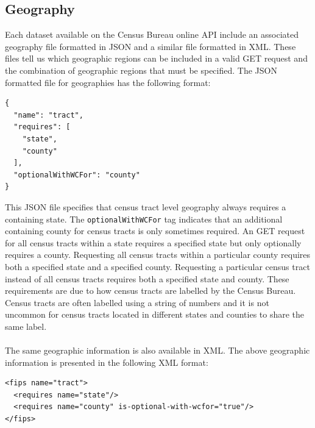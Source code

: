 \documentclass{article}\usepackage[]{graphicx}\usepackage[]{color}
\begin{document}
\subsection{Geography}
\label{sec:geo}
Each dataset available on the Census Bureau online API include an associated geography file formatted in JSON and a similar file formatted in XML.  These files tell us which geographic regions can be included in a valid GET request and the combination of geographic regions that must be specified.  The JSON formatted file for geographies has the following format:
\begin{verbatim}
{
  "name": "tract",
  "requires": [
    "state",
    "county"
  ],
  "optionalWithWCFor": "county"
}
\end{verbatim}
This JSON file specifies that census tract level geography always requires a containing state.  The {\tt optionalWithWCFor} tag indicates that an additional containing county for census tracts is only sometimes required.  An GET request for all census tracts within a state requires a specified state but only optionally requires a county.  Requesting all census tracts within a particular county requires both a specified state and a specified county.  Requesting a particular census tract instead of all census tracts requires both a specified state and county.  These requirements are due to how census tracts are labelled by the Census Bureau.  Census tracts are often labelled using a string of numbers and it is not uncommon for census tracts located in different states and counties to share the same label.\\
\\
The same geographic information is also available in XML.  The above geographic information is presented in the following XML format:
\begin{verbatim}
<fips name="tract">
  <requires name="state"/>
  <requires name="county" is-optional-with-wcfor="true"/>
</fips>
\end{verbatim}
\end{document}
